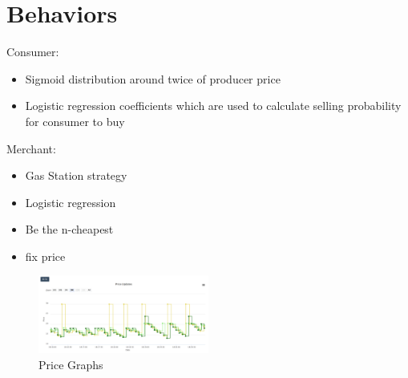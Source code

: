 \section{Behaviors}
\label{sec:Behaviors}

Consumer:
\begin{itemize}
\item Sigmoid distribution around twice of producer price
\item Logistic regression coefficients which are used to calculate selling probability for consumer to buy
\end{itemize}

Merchant:
\begin{itemize}
\item Gas Station strategy
\item Logistic regression 
\item Be the n-cheapest
\item fix price
\end{itemize}

%
\begin{figure}[h]
    \centering
    \includegraphics[width=0.5\textwidth]{images/price_graphs_v2.png}
    \caption{Price Graphs}
    \label{fig:price_graphs_v2}
\end{figure}
%